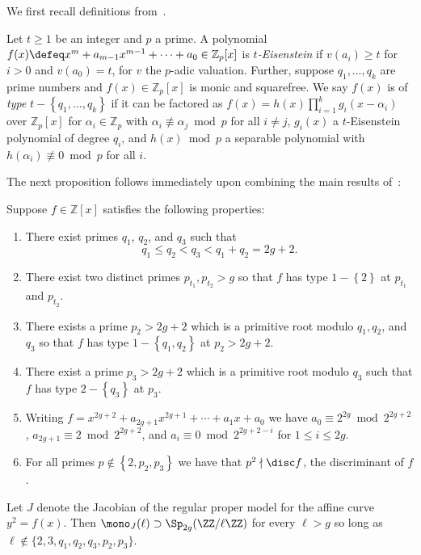 We first recall definitions from~\cite{anni2017constructing}.
\begin{definition}
	\label{definition:t-eisenstein}
	Let $t \geq 1$ be an integer and $p$ a prime. A polynomial $f(x) \defeq x^m + a_{m-1} x^{m-1} + \cdots + a_0 \in \mathbb Z_p[x]$
	is {\em $t$-Eisenstein} if $v(a_i) \geq t$ for $i > 0$ and $v(a_0) = t$, for $v$ the $p$-adic valuation.
	Further, suppose $q_1, \ldots, q_k$ are prime numbers and $f(x) \in \mathbb{Z}_p[x]$ is monic and squarefree.
	We say $f(x)$ is of {\em type} $t - \left\{ q_1, \ldots, q_k \right\}$ if it can be factored as
	$f(x) = h(x) \prod_{i=1}^k g_i(x-\alpha_i)$ over $\mathbb Z_p[x]$ for $\alpha_i \in \mathbb Z_p$ with
	$\alpha_i \not\equiv \alpha_j \bmod p$ for all $i \neq j$, $g_i(x)$ a $t$-Eisenstein polynomial
	of degree $q_i$, and $h(x) \bmod p$ a separable polynomial with $h(\alpha_i) \not \equiv 0 \bmod p$ for all $i$.
\end{definition}
The next proposition follows immediately upon combining the main results of~\cite{anni2017constructing}:
\begin{proposition}
	\label{prop-anni}
Suppose $f \in \mathbb{Z}[x]$ satisfies the following properties:
\begin{enumerate}
\item There exist primes $q_1$, $q_2$, and $q_3$ such that
$$q_1 \leq q_2 < q_3 < q_1 + q_2 = 2g + 2.$$
\item There exist two distinct primes $p_{t_1}, p_{t_2} > g$ so that $f$ has type $1 - \left\{ 2 \right\}$ at $p_{t_1}$ and $p_{t_2}$.
\item There exists a prime $p_2 > 2g+2$ which is a primitive root modulo $q_1, q_2$, and $q_3$ so that $f$ has type $1 - \left\{ q_1, q_2 \right\}$ at $p_2 > 2g + 2$.
\item There exist a prime $p_3 > 2g+2$  which is a primitive root modulo $q_3$ such that $f$ has type $2-\left\{ q_3 \right\}$ at $p_3$.
\item Writing $f = x^{2g+2} + a_{2g+1} x^{2g+1} + \cdots + a_1x + a_0$ we have $a_0\equiv 2^{2g} \bmod 2^{2g+2}$,
	$a_{2g+1}\equiv 2 \bmod 2^{2g+2}$, and $a_i\equiv 0 \bmod 2^{2g+2-i}$ for $1 \leq i \leq 2g$.
\item For all primes $p \notin \left\{ 2,p_2,p_3 \right\}$ we have that $p^2 \nmid \disc f$, the discriminant of $f$.
\end{enumerate}
Let $J$ denote the Jacobian of the regular proper model for the affine curve $y^2 = f(x)$.
Then $\mono_J(\ell) \supset \Sp_{2g}(\ZZ / \ell \ZZ)$ for every $\ell > g$ so long as $\ell \not\in \{2,3,q_1, q_2, q_3, p_2, p_3\}$.
\end{proposition}
